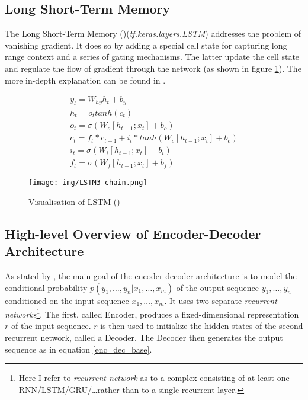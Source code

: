 \subsection{Long Short-Term Memory}

The Long Short-Term Memory (\citep{hochreiter1997})(\emph{tf.ke\-ras.lay\-ers.LSTM}) addresses the problem of vanishing gradient. It does so by adding a special cell state for capturing long range context and a series of gating mechanisms. The latter update the cell state and regulate the flow of gradient through the network (as shown in figure \ref{lstm}). The more in-depth explanation can be found in \citep{Olah2015}.

\begin{figure}[!h]
    \begin{gather}
        y_t = W_{hy}h_t + b_y \\
        h_t = o_t tanh(c_t) \\
        o_t = \sigma(W_o[h_{t-1};x_t] + b_o) \\
        c_t = f_t * c_{t-1} + i_t * tanh(W_c[h_{t-1}; x_t] + b_c)\\
        i_t = \sigma(W_i[h_{t-1}; x_t] + b_i)\\
        f_t = \sigma(W_f[h_{t-1}; x_t] + b_f)
    \end{gather}
\end{figure}
\begin{figure}
    \centering
    \texttt{[image: img/LSTM3-chain.png]}
    \caption{Visualisation of LSTM (\citep{Olah2015})} \label{lstm}
\end{figure}

\subsection{High-level Overview of Encoder-Decoder Architecture}

As stated by \citep{sutskever2014sequence}, the main goal of the encoder-decoder architecture is to model the conditional probability $p(y_1,\dots,y_n | x_1,\dots,x_m)$ of the output sequence $y_1,\dots,y_n$ conditioned on the input sequence $x_1,\dots,x_m$. It uses two separate \emph{recurrent networks}\footnote{Here I refer to \emph{recurrent network} as to a complex consisting of at least one RNN/LSTM/GRU/\dots rather than to a single recurrent layer.}. The first, called Encoder, produces a fixed-dimensional representation $r$ of the input sequence. $r$ is then used to initialize the hidden states of the second recurrent network, called a Decoder. The Decoder then generates the output sequence as in equation \ref{enc_dec_base}.

